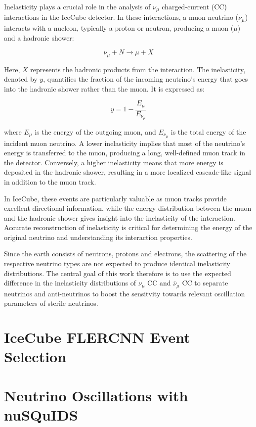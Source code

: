 \documentclass[a4paper,12pt,numbered]{article}
\begin{document}
Inelasticity plays a crucial role in the analysis of \(\nu_\mu\) charged-current (CC) interactions in the IceCube detector. In these interactions, a muon neutrino (\(\nu_\mu\)) interacts with a nucleon, typically a proton or neutron, producing a muon (\(\mu\)) and a hadronic shower:

\[
\nu_\mu + N \rightarrow \mu + X
\]

Here, \(X\) represents the hadronic products from the interaction. The inelasticity, denoted by \(y\), quantifies the fraction of the incoming neutrino's energy that goes into the hadronic shower rather than the muon. It is expressed as:

\[
y = 1 - \frac{E_\mu}{E_{\nu_\mu}}
\]

where \(E_\mu\) is the energy of the outgoing muon, and \(E_{\nu_\mu}\) is the total energy of the incident muon neutrino. A lower inelasticity implies that most of the neutrino's energy is transferred to the muon, producing a long, well-defined muon track in the detector. Conversely, a higher inelasticity means that more energy is deposited in the hadronic shower, resulting in a more localized cascade-like signal in addition to the muon track.

In IceCube, these events are particularly valuable as muon tracks provide excellent directional information, while the energy distribution between the muon and the hadronic shower gives insight into the inelasticity of the interaction. Accurate reconstruction of inelasticity is critical for determining the energy of the original neutrino and understanding its interaction properties.

Since the earth consists of neutrons, protons and electrons, the scattering of the respective neutrino types are not expected to produce identical inelasticity distributions. The central goal of this work therefore is to use the expected difference in the inelasticity distributions of $\nu_\mu$ CC and $\bar{\nu}_\mu$ CC to separate neutrinos and anti-neutrinos to boost the sensitvity towards relevant oscillation parameters of sterile neutrinos.

\section{IceCube FLERCNN Event Selection}

\section{Neutrino Oscillations with nuSQuIDS}
\end{document}

